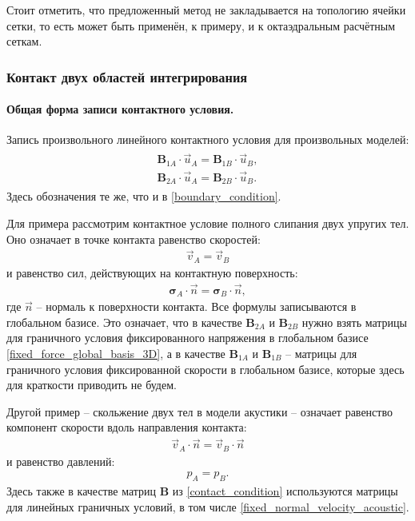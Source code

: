 \documentclass[a4paper]{article}
\numberwithin{equation}{section}
\begin{document}
Стоит отметить, что предложенный метод 
не закладывается на топологию ячейки сетки, то есть может быть применён, 
к примеру, и к октаэдральным расчётным сеткам.


\subsubsection{Контакт двух областей интегрирования}
\paragraph{Общая форма записи контактного условия.}
Запись произвольного линейного контактного условия для произвольных моделей:
\begin{eqnarray}
\label{contact_condition}
\begin{split}
	\mathbf{B}_{1A} \cdot \vec{u}_A = \mathbf{B}_{1B} \cdot \vec{u}_B, \\
	\mathbf{B}_{2A} \cdot \vec{u}_A = \mathbf{B}_{2B} \cdot \vec{u}_B.
\end{split}
\end{eqnarray}
Здесь обозначения те же, что и в \eqref{boundary_condition}.

Для примера рассмотрим контактное условие полного слипания двух упругих тел.
Оно означает в точке контакта равенство скоростей:
\begin{eqnarray}
\vec{v}_A = \vec{v}_B
\end{eqnarray}
и равенство сил, действующих на контактную поверхность:
\begin{eqnarray}
\mathbf{\sigma}_A \cdot \vec{n} = \mathbf{\sigma}_B \cdot \vec{n},
\end{eqnarray}
где $\vec{n}$ -- нормаль к поверхности контакта. 
Все формулы записываются в глобальном базисе. 
Это означает, что в качестве $\mathbf{B}_{2A}$ и $\mathbf{B}_{2B}$ 
нужно взять матрицы для граничного условия фиксированного напряжения в глобальном базисе 
\eqref{fixed_force_global_basis_3D}, а в качестве 
$\mathbf{B}_{1A}$ и $\mathbf{B}_{1B}$ -- матрицы для граничного условия 
фиксированной скорости в глобальном базисе, 
которые здесь для краткости приводить не будем.

Другой пример -- скольжение двух тел в модели акустики -- 
означает равенство компонент скорости вдоль направления контакта:
\begin{eqnarray}
\vec{v}_A \cdot \vec{n} = \vec{v}_B \cdot \vec{n}
\end{eqnarray}
и равенство давлений:
\begin{eqnarray}
p_A = p_B.
\end{eqnarray}
Здесь также в качестве матриц $\mathbf{B}$ из \eqref{contact_condition} 
используются матрицы для линейных граничных условий, в том числе 
\eqref{fixed_normal_velocity_acoustic}.
\end{document}
